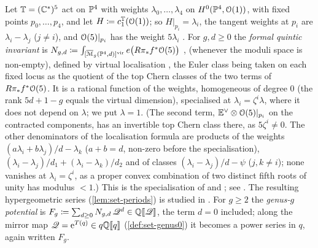 \begin{defn}
\label{def:set-fq}
Let $\mathbb{T}=(\mathbb{C}^*)^5$ act on $\mathbb{P}^4$ with weights $\lambda_0,\dots,\lambda_4$ on $H^0(\mathbb{P}^4,\mathcal{O}(1))$, with fixed points $p_0,\dots,p_4$, and let $H\coloneqq c_1^{\mathbb{T}}(\mathcal{O}(1))$; so $H|_{p_i}=\lambda_i$, the tangent weights at $p_i$ are $\lambda_i-\lambda_j$ ($j\neq i$), and $\mathcal{O}(5)|_{p_i}$ has the weight $5\lambda_i$ \cite[(10)]{LP20}. For $g,d\geq0$ the \emph{formal quintic invariant} is $N_{g,d}\coloneqq\int_{[\overline{\mathcal M}_g(\mathbb{P}^4,d)]^{\mathrm{vir}}}e\bigl(R\pi_*f^*\mathcal{O}(5)\bigr)$ \cite[Section~0.2, (5)]{LP18}, \cite[Section~0.2, (5)]{LP20} (whenever the moduli space is non-empty), defined by virtual localisation \cite{MR1666787}, the Euler class being taken on each fixed locus as the quotient of the top Chern classes of the two terms of $R\pi_*f^*\mathcal{O}(5)$. It is a rational function of the weights, homogeneous of degree $0$ (the rank $5d+1-g$ equals the virtual dimension), specialised at $\lambda_i=\zeta^i\lambda$, where it does not depend on $\lambda$; we put $\lambda=1$. (The second term, $\mathbb{E}^\vee\otimes\mathcal{O}(5)|_{p_i}$ on the contracted components, has an invertible top Chern class there, as $5\zeta^i\neq0$. The other denominators of the localisation formula are products of the weights $(a\lambda_i+b\lambda_j)/d-\lambda_k$ ($a+b=d$, non-zero before the specialisation), $(\lambda_i-\lambda_j)/d_1+(\lambda_i-\lambda_k)/d_2$ and of classes $(\lambda_i-\lambda_j)/d-\psi$ ($j,k\neq i$); none vanishes at $\lambda_i=\zeta^i$, as a proper convex combination of two distinct fifth roots of unity has modulus $<1$.) This is the specialisation of \cite[Section~0.2]{LP18} and \cite[Section~0.2]{LP20}; see \cite[Section~3.1; Section~3.2, (9)]{GJR18}. The resulting hypergeometric series (\cref{lem:set-periods}) is studied in \cite{ZZ08}. For $g\geq2$ the \emph{genus-$g$ potential} is $F_g\coloneqq\sum_{d\geq0}N_{g,d}\,\mathscr{Q}^d\in\mathbb{Q}[\![ \mathscr{Q} ]\!]$, the term $d=0$ included; along the mirror map $\mathscr{Q}=\mathrm{e}^{T(q)}\in q\mathbb{Q}[\![ q ]\!]$ (\cref{def:set-genus0}) it becomes a power series in $q$, again written $F_g$.


\end{defn}
